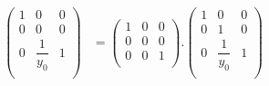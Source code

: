 \documentclass[10pt,a4paper]{article}
\begin{document}
\begin{equation*}
\begin{aligned}
    \begin{pmatrix}
    1 & 0 & 0  \\
    0 & 0 & 0 \\
    0 & \dfrac{1}{y_0} & 1  \\
  \end{pmatrix}  
 &= 
  \begin{pmatrix}
    1 & 0 & 0  \\
    0 & 0 & 0 \\
    0 & 0 & 1  \\
  \end{pmatrix}.
  \begin{pmatrix}
     1 & 0 & 0  \\
    0 & 1 & 0 \\
    0 & \dfrac{1}{y_0} & 1  \\
  \end{pmatrix}
\end{aligned}
\end{equation*}
\end{document}
